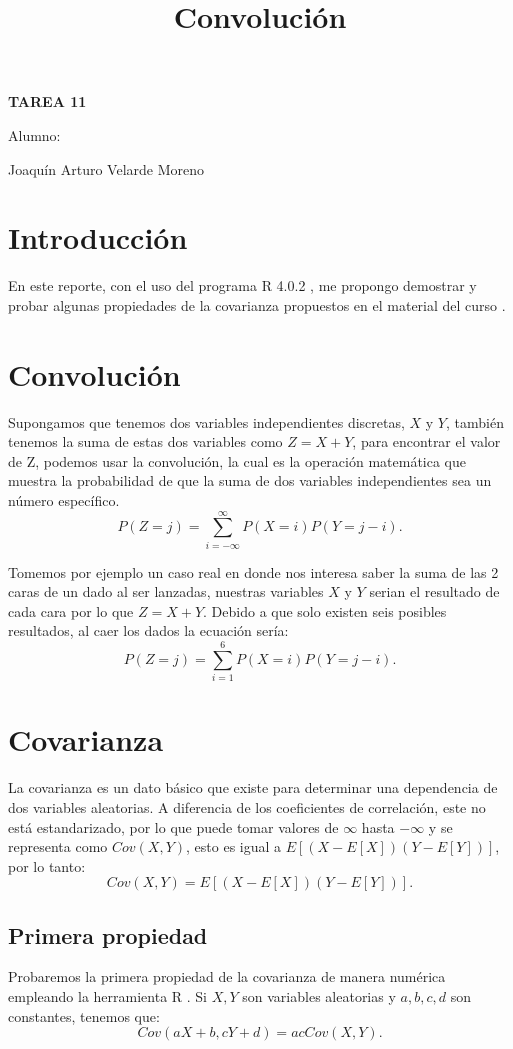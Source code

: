\documentclass[]{article}
\title{Convolución}
\date{}
\begin{document}
	\maketitle
	\begin{center}


\centerline{\textbf{TAREA 11} } 
\textbf{ }

\centerline{Alumno: } 
\centerline{Joaquín Arturo Velarde Moreno}


	\end{center}
	

\section{Introducción}
En este reporte, con el uso del programa R 4.0.2 \cite{rproject}, me propongo demostrar y probar algunas propiedades de la covarianza propuestos en el material del curso \cite{MaterialClase}.
\section{Convolución}
Supongamos que tenemos dos variables independientes discretas, $X$ y $Y$, también tenemos la suma de estas dos variables como $Z = X + Y$, para encontrar el valor de Z, podemos usar la convolución, la cual es la operación matemática que muestra la probabilidad de que la suma de dos variables independientes sea un número específico.  
\[P(Z = j) = \sum_{i = -\infty}^{\infty}P(X = i)P(Y = j-i). \]

Tomemos por ejemplo un caso real en donde nos interesa saber la suma de las 2 caras de un dado al ser lanzadas, nuestras variables $X$ y $Y$ serian el resultado de cada cara por lo que $Z = X + Y$. Debido a que solo existen seis posibles resultados, al caer los dados la ecuación sería:
\[P(Z = j) = \sum_{i = 1}^{6}P(X = i)P(Y = j-i). \]


\section{Covarianza}

La covarianza es un dato básico que existe para determinar una dependencia de dos variables aleatorias. A diferencia de los coeficientes de correlación, este no está estandarizado, por lo que puede tomar valores de $\infty$ hasta $-\infty$ y se representa como $Cov(X,Y)$, esto es igual a $E[(X - E[X])(Y - E[Y])]$, por lo tanto:
\[Cov(X,Y) = E[(X - E[X])(Y - E[Y])]. \]
\subsection{Primera propiedad}
Probaremos la primera propiedad de la covarianza de manera numérica empleando la herramienta R \cite{rproject}. Si $X,Y$ son variables aleatorias y $a, b, c, d$ son constantes, tenemos que:
\[Cov(aX + b,cY + d) = acCov(X,Y). \]
\end{document}
